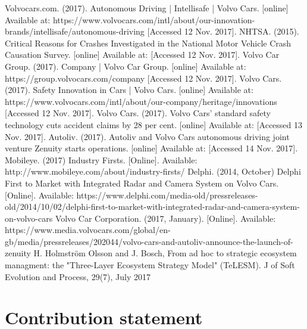 \documentclass[conference]{IEEEtran}
\begin{document}
\begin{thebibliography}{00}
	 Volvocars.com. (2017). Autonomous Driving | Intellisafe | Volvo Cars. [online] Available at: https://www.volvocars.com/intl/about/our-innovation-brands/intellisafe/autonomous-driving [Accessed 12 Nov. 2017].
	 NHTSA. (2015). Critical Reasons for Crashes Investigated in the National Motor Vehicle Crash Causation Survey. [online] Available at:  [Accessed 12 Nov. 2017].
	 Volvo Car Group. (2017). Company | Volvo Car Group. [online] Available at: https://group.volvocars.com/company [Accessed 12 Nov. 2017].
	 Volvo Cars. (2017). Safety Innovation in Cars | Volvo Cars. [online] Available at: https://www.volvocars.com/intl/about/our-company/heritage/innovations [Accessed 12 Nov. 2017].
	 Volvo Cars. (2017). Volvo Cars' standard safety technology cuts accident claims by 28 per cent. [online] Available at:  [Accessed 13 Nov. 2017].
	 Autoliv. (2017). Autoliv and Volvo Cars autonomous driving joint venture Zenuity starts operations. [online] Available at:  [Accessed 14 Nov. 2017].
	  Mobileye. (2017) Industry Firsts. [Online]. Available: http://www.mobileye.com/about/industry-firsts/
	 Delphi. (2014, October) Delphi First to Market with Integrated Radar and Camera System on Volvo Cars. [Online]. Available: https://www.delphi.com/media-old/pressreleases-old/2014/10/02/delphi-first-to-market-with-integrated-radar-and-camera-system-on-volvo-cars
	 Volvo Car Corporation. (2017, January). [Online]. Available: https://www.media.volvocars.com/global/en-gb/media/pressreleases/202044/volvo-cars-and-autoliv-announce-the-launch-of-zenuity
	 H. Holmstr\"{o}m Olsson and J. Bosch, From ad hoc to strategic ecosystem managment: the "Three-Layer Ecosystem Strategy Model" (TeLESM). J of Soft Evolution and Process, 29(7), July 2017
\end{thebibliography}

\pagebreak
\appendix
\section*{Contribution statement}
\end{document}
